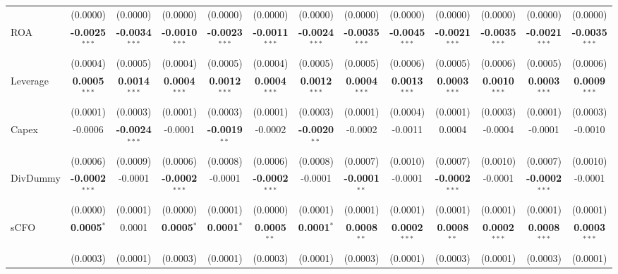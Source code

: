 \documentclass[11pt,a4paper]{article}
\begin{document}
\begin{table}[htbp]
\begin{tabular}{lcccccccccccc}
 & (0.0000) & (0.0000) & (0.0000) & (0.0000) & (0.0000) & (0.0000) & (0.0000) & (0.0000) & (0.0000) & (0.0000) & (0.0000) & (0.0000) \\
ROA & \textbf{-0.0025}$^{***}$ & \textbf{-0.0034}$^{***}$ & \textbf{-0.0010}$^{***}$ & \textbf{-0.0023}$^{***}$ & \textbf{-0.0011}$^{***}$ & \textbf{-0.0024}$^{***}$ & \textbf{-0.0035}$^{***}$ & \textbf{-0.0045}$^{***}$ & \textbf{-0.0021}$^{***}$ & \textbf{-0.0035}$^{***}$ & \textbf{-0.0021}$^{***}$ & \textbf{-0.0035}$^{***}$ \\
 & (0.0004) & (0.0005) & (0.0004) & (0.0005) & (0.0004) & (0.0005) & (0.0005) & (0.0006) & (0.0005) & (0.0006) & (0.0005) & (0.0006) \\
Leverage & \textbf{0.0005}$^{***}$ & \textbf{0.0014}$^{***}$ & \textbf{0.0004}$^{***}$ & \textbf{0.0012}$^{***}$ & \textbf{0.0004}$^{***}$ & \textbf{0.0012}$^{***}$ & \textbf{0.0004}$^{***}$ & \textbf{0.0013}$^{***}$ & \textbf{0.0003}$^{***}$ & \textbf{0.0010}$^{***}$ & \textbf{0.0003}$^{***}$ & \textbf{0.0009}$^{***}$ \\
 & (0.0001) & (0.0003) & (0.0001) & (0.0003) & (0.0001) & (0.0003) & (0.0001) & (0.0004) & (0.0001) & (0.0003) & (0.0001) & (0.0003) \\
Capex & -0.0006 & \textbf{-0.0024}$^{***}$ & -0.0001 & \textbf{-0.0019}$^{**}$ & -0.0002 & \textbf{-0.0020}$^{**}$ & -0.0002 & -0.0011 & 0.0004 & -0.0004 & -0.0001 & -0.0010 \\
 & (0.0006) & (0.0009) & (0.0006) & (0.0008) & (0.0006) & (0.0008) & (0.0007) & (0.0010) & (0.0007) & (0.0010) & (0.0007) & (0.0010) \\
DivDummy & \textbf{-0.0002}$^{***}$ & -0.0001 & \textbf{-0.0002}$^{***}$ & -0.0001 & \textbf{-0.0002}$^{***}$ & -0.0001 & \textbf{-0.0001}$^{**}$ & -0.0001 & \textbf{-0.0002}$^{***}$ & -0.0001 & \textbf{-0.0002}$^{***}$ & -0.0001 \\
 & (0.0000) & (0.0001) & (0.0000) & (0.0001) & (0.0000) & (0.0001) & (0.0001) & (0.0001) & (0.0001) & (0.0001) & (0.0001) & (0.0001) \\
sCFO & \textbf{0.0005}$^{*}$ & 0.0001 & \textbf{0.0005}$^{*}$ & \textbf{0.0001}$^{*}$ & \textbf{0.0005}$^{**}$ & \textbf{0.0001}$^{*}$ & \textbf{0.0008}$^{**}$ & \textbf{0.0002}$^{***}$ & \textbf{0.0008}$^{**}$ & \textbf{0.0002}$^{***}$ & \textbf{0.0008}$^{***}$ & \textbf{0.0003}$^{***}$ \\
 & (0.0003) & (0.0001) & (0.0003) & (0.0001) & (0.0003) & (0.0001) & (0.0003) & (0.0001) & (0.0003) & (0.0001) & (0.0003) & (0.0001) \\

\end{tabular}
\end{table}
\end{document}
